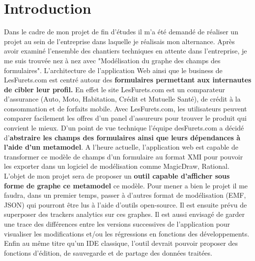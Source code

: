 \chapter{Introduction}
Dans le cadre de mon projet de fin d'études il m'a été demandé de réaliser un projet au sein de l'entreprise dans laquelle je réalisais mon alternance. Après avoir examiné l'ensemble des chantiers techniques en attente dans l'entreprise, je me suis trouvée nez à nez avec "Modélisation du graphe des champs des formulaires". L'architecture de l'application Web ainsi que le business de LesFurets.com est centré autour des \textbf{formulaires permettant aux internautes de cibler leur profil.} En effet le site LesFurets.com est un comparateur d'assurance (Auto, Moto, Habitation, Crédit et Mutuelle Santé), de crédit à la consommation et de forfaits mobile. Avec LesFurets.com, les utilisateurs peuvent comparer facilement les offres d’un panel d’assureurs pour trouver le produit qui convient le mieux. D’un point de vue technique l’équipe desFurets.com a décidé d’\textbf{abstraire les champs des formulaires ainsi que leurs dépendances à l’aide d'un metamodel}. A l’heure actuelle, l’application web est capable de transformer ce modèle de champs d'un formulaire au format XMI pour pouvoir les exporter dans un logiciel de modélisation comme MagicDraw, Rational. L'objet de mon projet sera de proposer un \textbf{outil capable d'afficher sous forme de graphe ce metamodel} ce modèle. Pour mener a bien le projet il me faudra, dans un premier temps, passer à d’autres format de modélisation (EMF, JSON) qui pourront être lus à l'aide d'outils open-source. Il est ensuite prévu de superposer des trackers analytics sur ces graphes. Il est aussi envisagé de garder une trace des différences entre les versions successives de l’application pour visualiser les modifications et/ou les régressions en fonctions des développements. Enfin au même titre qu'un IDE classique, l’outil devrait pouvoir proposer des fonctions d’édition, de sauvegarde et de partage des données traitées.